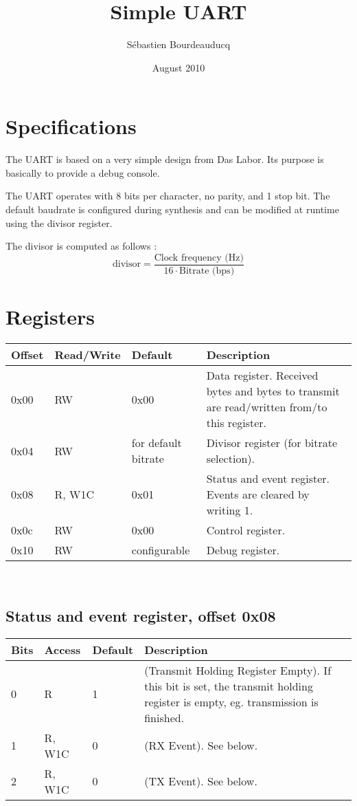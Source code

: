 \documentclass[a4paper,11pt]{article}
\title{Simple UART}
\author{S\'ebastien Bourdeauducq}
\date{August 2010}
\begin{document}
\setlength{\parindent}{0pt}
\setlength{\parskip}{5pt}
\maketitle{}
\section{Specifications}
The UART is based on a very simple design from Das Labor. Its purpose is basically to provide a debug console.

The UART operates with 8 bits per character, no parity, and 1 stop bit. The default baudrate is configured during synthesis and can be modified at runtime using the divisor register.

The divisor is computed as follows :
\begin{equation*}
\text{divisor} = \frac{\text{Clock frequency (Hz)}}{16 \cdot \text{Bitrate (bps)}}
\end{equation*}

\section{Registers}
\begin{tabularx}{\textwidth}{|l|l|l|X|}
\hline
\bf{Offset} & \bf{Read/Write} & \bf{Default} & \bf{Description} \\
\hline
0x00 & RW & 0x00 & Data register. Received bytes and bytes to transmit are read/written from/to this register. \\
\hline
0x04 & RW & for default bitrate & Divisor register (for bitrate selection). \\
\hline
0x08 & R, W1C & 0x01 & Status and event register. Events are cleared by writing 1. \\
\hline
0x0c & RW & 0x00 & Control register. \\
\hline
0x10 & RW & configurable & Debug register. \\
\hline
\end{tabularx}\\

\subsection{Status and event register, offset 0x08}
\begin{tabularx}{\textwidth}{|l|l|l|X|}
\hline
\bf Bits & \bf Access & \bf Default & \bf Description \\
\hline
0 & R & 1 & (Transmit Holding Register Empty). If this bit is set, the transmit holding register is empty, eg. transmission is finished. \\
\hline
1 & R, W1C & 0 & (RX Event). See below. \\
\hline
2 & R, W1C & 0 & (TX Event). See below. \\
\hline
\end{tabularx}
\end{document}
